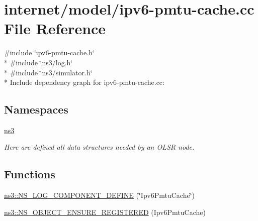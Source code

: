 \hypertarget{ipv6-pmtu-cache_8cc}{}\section{internet/model/ipv6-\/pmtu-\/cache.cc File Reference}
\label{ipv6-pmtu-cache_8cc}
{\ttfamily \#include \char`\"{}ipv6-\/pmtu-\/cache.\+h\char`\"{}}\\*
{\ttfamily \#include \char`\"{}ns3/log.\+h\char`\"{}}\\*
{\ttfamily \#include \char`\"{}ns3/simulator.\+h\char`\"{}}\\*
Include dependency graph for ipv6-\/pmtu-\/cache.cc\+:
\subsection*{Namespaces}
\begin{DoxyCompactItemize}
\item 
 \hyperlink{namespacens3}{ns3}
\begin{DoxyCompactList}\small\item\em Here are defined all data structures needed by an O\+L\+SR node. \end{DoxyCompactList}\end{DoxyCompactItemize}
\subsection*{Functions}
\begin{DoxyCompactItemize}
\item 
\hyperlink{namespacens3_a805b73e785b3c9c650e79185848e16e7}{ns3\+::\+N\+S\+\_\+\+L\+O\+G\+\_\+\+C\+O\+M\+P\+O\+N\+E\+N\+T\+\_\+\+D\+E\+F\+I\+NE} (\char`\"{}Ipv6\+Pmtu\+Cache\char`\"{})
\item 
\hyperlink{namespacens3_a7ac31be5344049af5cda5295011a47f2}{ns3\+::\+N\+S\+\_\+\+O\+B\+J\+E\+C\+T\+\_\+\+E\+N\+S\+U\+R\+E\+\_\+\+R\+E\+G\+I\+S\+T\+E\+R\+ED} (Ipv6\+Pmtu\+Cache)
\end{DoxyCompactItemize}
